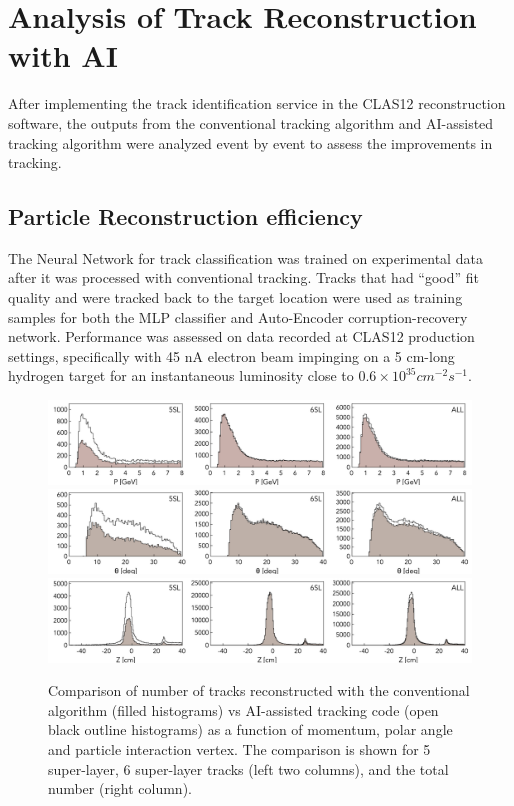\section{Analysis of Track Reconstruction with AI}

After implementing the track identification service in the CLAS12 
reconstruction software, the outputs from the conventional tracking 
algorithm and AI-assisted tracking algorithm were analyzed event by 
event to assess the improvements in tracking. 
 
 \subsection{Particle Reconstruction efficiency}
 
 The Neural Network for track classification was trained on experimental 
 data after it was processed with conventional tracking. Tracks that had ``good'' 
 fit quality and were tracked back to the target location were used as training 
 samples for both the MLP classifier and Auto-Encoder corruption-recovery network. 
 Performance was assessed on data recorded at CLAS12 production settings, 
 specifically with 45 nA electron beam impinging on a 5 cm-long hydrogen target 
 for an instantaneous luminosity close to $0.6\times10^{35} cm^{-2} s^{-1}$.

 \begin{figure}[!ht]
\begin{center}
  \includegraphics[width=6.5in]{images/figure_p.pdf}
  \includegraphics[width=6.5in]{images/figure_theta.pdf}
    \includegraphics[width=6.5in]{images/figure_vz.pdf}
\caption { Comparison of number of tracks reconstructed with the conventional 
algorithm (filled histograms) vs AI-assisted tracking code (open black outline 
histograms) as a function of momentum, polar angle and particle interaction vertex. 
The comparison is shown for 5 super-layer, 6 super-layer tracks (left two columns), 
and the total number (right column).}
 \label{track:efficiency}
 \end{center}
\end{figure}

